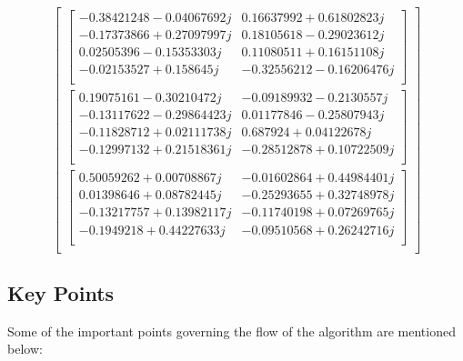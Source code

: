 \documentclass[conference]{IEEEtran}
\begin{document}
{$$\begin{bmatrix}
\begin{bmatrix}
-0.38421248-0.04067692j& 0.16637992+0.61802823j\\ 
-0.17373866+0.27097997j& 0.18105618-0.29023612j \\
0.02505396-0.15353303j& 0.11080511+0.16151108j\\
-0.02153527+0.158645j& -0.32556212-0.16206476j\\
\end{bmatrix}\\
\begin{bmatrix}
0.19075161-0.30210472j& -0.09189932-0.2130557j\\  
-0.13117622-0.29864423j&  0.01177846-0.25807943j\\
-0.11828712+0.02111738j&  0.687924  +0.04122678j\\
-0.12997132+0.21518361j& -0.28512878+0.10722509j\\
\end{bmatrix}\\
\begin{bmatrix}
0.50059262+0.00708867j& -0.01602864+0.44984401j\\  
0.01398646+0.08782445j& -0.25293655+0.32748978j\\
-0.13217757+0.13982117j& -0.11740198+0.07269765j\\
-0.1949218 +0.44227633j& -0.09510568+0.26242716j\\
\end{bmatrix}\\
\end{bmatrix}
$$
}
\subsection{Key Points}
Some of the important points governing the flow of the algorithm are mentioned below:
\end{document}
